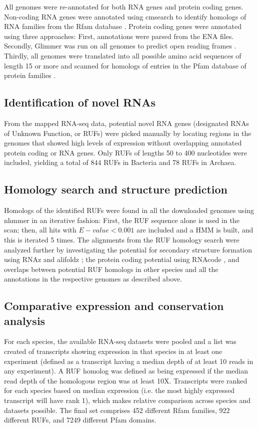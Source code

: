 \documentclass[10pt]{article}
\begin{document}
All genomes were re-annotated for both RNA genes and protein coding
genes. Non-coding RNA genes were annotated using cmsearch
\cite{Nawrocki:2013} to identify homologs of RNA families from the
Rfam database \cite{Gardner:2011,Burge:2013}. Protein coding genes
were annotated using three approaches: First, annotations were parsed
from the ENA files. Secondly, Glimmer was run on all genomes to
predict open reading frames \cite{Delcher:2007}. Thirdly, all genomes
were translated into all possible amino acid sequences of length 15 or
more and scanned for homologs of entries in the Pfam database of
protein families \cite{Punta:2012,Finn:2014}.

\subsection*{Identification of novel RNAs}

From the mapped RNA-seq data, potential novel RNA genes (designated
RNAs of Unknown Function, or RUFs) were picked manually by locating
regions in the genomes that showed high levels of expression without
overlapping annotated protein coding or RNA genes. Only RUFs of
lengths 50 to 400 nucleotides were included, yielding a total of 844
RUFs in Bacteria and 78 RUFs in Archaea.

\subsection*{Homology search and structure prediction}

Homologs of the identified RUFs were found in all the downloaded
genomes using nhmmer \cite{Wheeler:2013} in an iterative fashion:
First, the RUF sequence alone is used in the scan; then, all hits with
$E-value<0.001$ are included and a HMM is built, and this is iterated
5 times. The alignments from the RUF homology search were analyzed
further by investigating the potential for secondary structure
formation using RNAz \cite{Gruber:2010} and alifoldz
\cite{Washietl:2004}; the protein coding potential using RNAcode
\cite{Washietl:2011}, and overlaps between potential RUF homologs in
other species and all the annotations in the respective genomes as
described above.

\subsection*{Comparative expression and conservation analysis}

For each species, the available RNA-seq datasets were pooled and a
list was created of transcripts showing expression in that species in
at least one experiment (defined as a transcript having a median depth
of at least 10 reads in any experiment). A RUF homolog was defined as
being expressed if the median read depth of the homologous region was
at least 10X. Transcripts were ranked for each species based on median
expression (i.e. the most highly expressed transcript will have rank
1), which makes relative comparison across species and datasets
possible. The final set comprises 452 different Rfam families, 922
different RUFs, and 7249 different Pfam domains.
\end{document}
